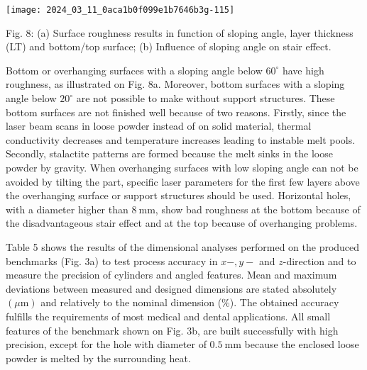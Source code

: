 \documentclass[10pt]{article}
\begin{document}
\begin{center}
\texttt{[image: 2024\_03\_11\_0aca1b0f099e1b7646b3g-115]}
\end{center}

Fig. 8: (a) Surface roughness results in function of sloping angle, layer thickness (LT) and bottom/top surface; (b) Influence of sloping angle on stair effect.

Bottom or overhanging surfaces with a sloping angle below $60^{\circ}$ have high roughness, as illustrated on Fig. 8a. Moreover, bottom surfaces with a sloping angle below $20^{\circ}$ are not possible to make without support structures. These bottom surfaces are not finished well because of two reasons. Firstly, since the laser beam scans in loose powder instead of on solid material, thermal conductivity decreases and temperature increases leading to instable melt pools. Secondly, stalactite patterns are formed because the melt sinks in the loose powder by gravity. When overhanging surfaces with low sloping angle can not be avoided by tilting the part, specific laser parameters for the first few layers above the overhanging surface or support structures should be used. Horizontal holes, with a diameter higher than $8 \mathrm{~mm}$, show bad roughness at the bottom because of the disadvantageous stair effect and at the top because of overhanging problems.

Table 5 shows the results of the dimensional analyses performed on the produced benchmarks (Fig. 3a) to test process accuracy in $x-, y-$ and $z$-direction and to measure the precision of cylinders and angled features. Mean and maximum deviations between measured and designed dimensions are stated absolutely $(\mu \mathrm{m})$ and relatively to the nominal dimension (\%). The obtained accuracy fulfills the requirements of most medical and dental applications. All small features of the benchmark shown on Fig. 3b, are built successfully with high precision, except for the hole with diameter of $0.5 \mathrm{~mm}$ because the enclosed loose powder is melted by the surrounding heat.
\end{document}
